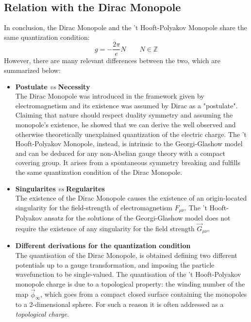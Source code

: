 \documentclass[main.tex]{subfiles}
\begin{document}
\subsection{Relation with the Dirac Monopole}
In conclusion, the Dirac Monopole and the 't Hooft-Polyakov Monopole share the same quantization condition: 
\begin{equation}
g = - \frac{2\pi}{e} N \qquad N \in  \mathbb{Z}
\end{equation}
However, there are many relevant differences between the two, which are summarized below:
\begin{itemize}
     \item \textbf{Postulate} \textit{vs} \textbf{Necessity}\medskip \\
    The Dirac Monopole was introduced in the framework given by electromagnetism and its existence was assumed by Dirac as a "postulate".
    Claiming that nature should respect duality symmetry  and assuming the monopole's existence, he showed that we can derive the well observed and otherwise theoretically unexplained quantization of the electric charge. 
    The 't Hooft-Polyakov Monopole, instead, is intrinsic to the Georgi-Glashow model and can be deduced for any non-Abelian gauge theory with a compact covering group.
    It arises from a spontaneous symmetry breaking and fulfills the same quantization condition of the Dirac Monopole.
    
    \item \textbf{Singularites} \textit{vs} \textbf{Regularites}\medskip \\
    The existence of the Dirac Monopole causes the existence of an origin-located singularity for the field-strength of electromagnetism $F_{\mu \nu}$.
    The 't Hooft-Polyakov ansatz for the solutions of the Georgi-Glashow model does not require the existence of any singularity for the field strength $\vec{G}_{\mu \nu }$.
    
    \item \textbf{Different derivations for the quantization condition} \medskip \\
    The quantisation of the Dirac Monopole, is obtained defining two different potentials up to a gauge transformation, and imposing the particle wavefunction to be single-valued. 
    The quantisation of the 't Hooft-Polyakov monopole charge is due to a topological property: the winding number of the map $\vec{\phi}_\infty $, which goes from a compact closed surface containing the monopoles to a 2-dimensional sphere. For such a reason it is often addressed as a \textit{topological charge}.
\end{itemize} 
\end{document}
